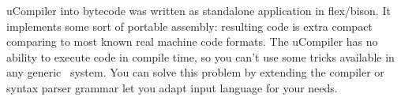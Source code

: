 \clearpage{}\label{ucompiler}

uCompiler into bytecode was written as standalone application in flex/bison. It
implements some sort of portable assembly: resulting code is extra compact
comparing to most known real machine code formats. The uCompiler has no ability
to execute code in compile time, so you can't use some tricks available in
any generic \F\ system. You can solve this problem by extending the compiler
or syntax parser grammar let you adapt input language for your needs.
